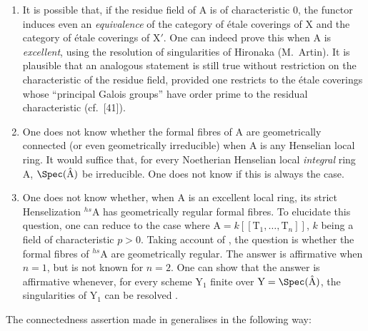 \begin{remarks}[18.9.6]
\label{IV.18.9.6}
\begin{enumerate}[label=\emph{\roman*)}]
  \item It is possible that, if the residue field of A is of characteristic 0, the functor  induces even an \emph{equivalence} of the category of \'{e}tale coverings of X and the category of \'{e}tale coverings of $\mathrm{X}'$.
  One can indeed prove this when A is \emph{excellent}, using the resolution of singularities of Hironaka (M.~Artin).
  It is plausible that an analogous statement is still true without restriction on the characteristic of the residue field, provided one restricts to the \'{e}tale coverings whose ``principal Galois groups'' have order prime to the residual characteristic (cf.~[41]).

  \item One does not know whether the formal fibres of A are geometrically connected (or even geometrically irreducible) when A is any Henselian local ring.
  It would suffice that, for every Noetherian Henselian local \emph{integral} ring A, $\Spec(\hat{\mathrm{A}})$ be irreducible.
  One does not know if this is always the case.

  \item One does not know whether, when A is an excellent local ring, its strict Henselization ${}^{hs}\!\mathrm{A}$ has geometrically regular formal fibres.
  To elucidate this question, one can reduce to the case where $\mathrm{A}=k[[\mathrm{T}_1,\ldots,\mathrm{T}_n]]$, $k$ being a field of characteristic $p>0$.
  Taking account of , the question is whether the formal fibres of ${}^{hs}\!\mathrm{A}$ are geometrically regular.
  The answer is affirmative when $n=1$, but is not known for $n=2$.
  One can show that the answer is affirmative whenever, for every scheme $\mathrm{Y}_1$ finite over $\mathrm{Y}=\Spec(\hat{\mathrm{A}})$, the singularities of $\mathrm{Y}_1$ can be resolved .
\end{enumerate}
\end{remarks}

The connectedness assertion made in  generalises in the following way:

